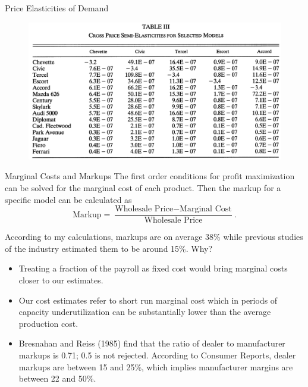 \documentclass{beamer}
\begin{document}
\begin{frame}{Price Elasticities of Demand}
	\begin{figure}[h]
		\centering
		\includegraphics[scale=0.45]{table_3.png}
	\end{figure}
\end{frame}
\begin{frame}{Marginal Costs and Markups}
	The first order conditions for profit maximization can be solved for the marginal cost of each product. Then the markup for a specific model can be calculated as
	\begin{equation}
		\mbox{Markup}=\frac{\mbox{Wholesale Price}-\mbox{Marginal Cost}}{\mbox{Wholesale Price}}.
	\end{equation}

	According to my calculations, markups are on average 38\% while previous studies of the industry estimated them to be around 15\%. Why?
	\begin{itemize}
		\item Treating a fraction of the payroll as fixed cost would bring marginal costs closer to our estimates.
		\item Our cost estimates refer to short run marginal cost which in periods of capacity underutilization can be substantially lower than the average production cost.
		\item Bresnahan and Reiss (1985) find that the ratio of dealer to manufacturer markups is 0.71; 0.5 is not rejected. According to Consumer Reports, dealer markups are between 15 and 25\%, which implies manufacturer margins are between 22 and 50\%.
	\end{itemize}
\end{frame}
\end{document}
